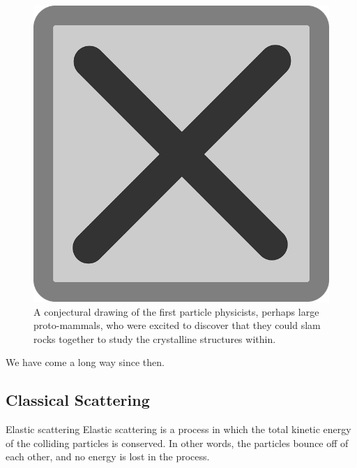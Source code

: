 \begin{figure}[t!]
    \centering
    \includegraphics[width=\textwidth]{figures/tempfig}

    \caption{
        A conjectural drawing of the first particle physicists, perhaps large proto-mammals, who were excited to discover that they could slam rocks together to study the crystalline structures within.
    }

    \label{fig:label}
\end{figure}

We have come a long way since then.


\subsection{Classical Scattering}


    \begin{definition}{Elastic scattering}{}
        Elastic scattering is a process in which the total kinetic energy of the colliding particles is conserved.
        In other words, the particles bounce off of each other, and no energy is lost in the process.
    \end{definition}


